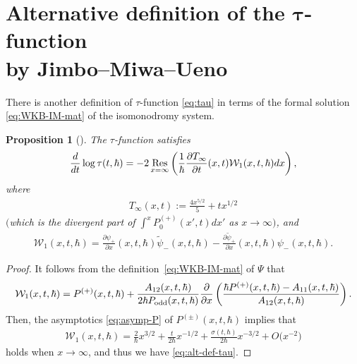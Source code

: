 \documentclass[pdftex]{sigma}
\newtheorem{prop}[thm]{Proposition}
\theoremstyle{definition}
\numberwithin{equation}{section}
\def\p{\partial}
\newcommand{\Res}{\mathop{\rm Res}}
\begin{document}
\appendix

\section[Alternative def\/inition of the $\tau$-function by Jimbo--Miwa--Ueno]{Alternative def\/inition of the $\boldsymbol{\tau}$-function\\ by Jimbo--Miwa--Ueno}
\label{section:relation-of-two-conjectures}

There is another def\/inition of $\tau$-function
\eqref{eq:tau} in terms of the formal
solution \eqref{eq:WKB-IM-mat} of the isomonodromy system.
\begin{prop}[]
The $\tau$-function satisfies
\begin{gather} \label{eq:alt-def-tau}
\frac{d}{dt} \log \tau(t,\hbar) = -2 \Res_{x=\infty} \left(
\frac{1}{\hbar} \frac{\partial T_{\infty}}{\partial t}(x,t)
{\mathcal W}_{1}(x,t,\hbar) dx \right),
\end{gather}
where
\begin{gather*}
T_{\infty}(x,t) := \frac{4x^{5/2}}{5} + t x^{1/2}
\end{gather*}
$($which is the divergent part of $\int^{x}P_{0}^{(+)}(x',t)dx'$
as $x\rightarrow \infty)$, and
\begin{gather*}
{\mathcal W}_{1}(x,t,\hbar) =
\frac{\p \psi_{+}}{\partial x}(x,t,\hbar) \tilde{\psi}_{-}(x,t,\hbar)
- \frac{\p \tilde{\psi}_{+} }{\p x}(x,t,\hbar){\psi}_{-}(x,t,\hbar).
\end{gather*}
\end{prop}

\begin{proof}
It follows from the def\/inition~\eqref{eq:WKB-IM-mat} of $\Psi$ that
\begin{gather*} %
{\mathcal W}_{1}(x,t,\hbar) =
P^{(+)}(x,t,\hbar) +
\frac{A_{12}(x,t,\hbar)}{2\hbar P_{\rm odd}(x,t,\hbar)}
\frac{\p}{\p x}\left( \frac{\hbar P^{(+)} (x,t,\hbar)
- A_{11}(x,t,\hbar)}
{A_{12}(x,t,\hbar)} \right).
\end{gather*}
Then, the asymptotics \eqref{eq:asymp-P}
of $P^{(\pm)}(x,t,\hbar)$ implies that
\begin{gather*}
{\mathcal W}_{1}(x,t,\hbar)
= \frac{2}{\hbar}x^{3/2} + \frac{t}{2\hbar}x^{-1/2} +
\frac{\sigma(t,\hbar)}{2\hbar} x^{-3/2}
+ O\big(x^{-2}\big)
\end{gather*}
holds when $x \rightarrow \infty$, and
thus we have \eqref{eq:alt-def-tau}.
\end{proof}
\end{document}
